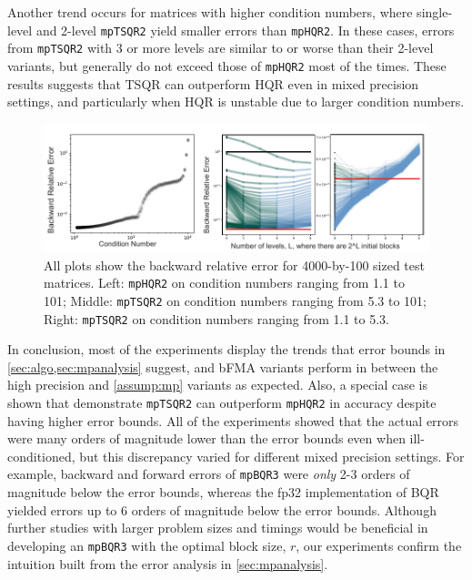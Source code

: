\documentclass[review,onefignum,onetabnum]{siamart190516}
\begin{document}
Another trend occurs for matrices with higher condition numbers, where single-level and 2-level {\tt mpTSQR2} yield smaller errors than {\tt mpHQR2}. 
In these cases, errors from {\tt mpTSQR2} with 3 or more levels are similar to or worse than their 2-level variants, but generally do not exceed those of {\tt mpHQR2} most of the times.
These results suggests that TSQR can outperform HQR even in mixed precision settings, and particularly when HQR is unstable due to larger condition numbers.
\begin{figure}[h!]%
	\centering
	\includegraphics[width=\textwidth]{./figures/allTSQR3.pdf}
	\vspace{-15pt}
	\caption{\label{fig:allTSQR} All plots show the backward relative error for 4000-by-100 sized test matrices. Left: {\tt mpHQR2} on condition numbers ranging from 1.1 to 101;  Middle: {\tt mpTSQR2} on condition numbers ranging from 5.3 to 101; Right:  {\tt mpTSQR2} on condition numbers ranging from 1.1 to 5.3. }
	\vspace{-15pt}
\end{figure}

In conclusion, most of the experiments display the trends that error bounds in \cref{sec:algo,sec:mpanalysis} suggest, and bFMA variants perform in between the high precision and \cref{assump:mp} variants as expected.
Also, a special case is shown that demonstrate {\tt mpTSQR2} can outperform {\tt mpHQR2} in accuracy despite having higher error bounds.
All of the experiments showed that the actual errors were many orders of magnitude lower than the error bounds even when ill-conditioned, but this discrepancy varied for different mixed precision settings.
For example, backward and forward errors of {\tt mpBQR3} were \emph{only} 2-3 orders of magnitude below the error bounds, whereas the fp32 implementation of BQR yielded errors up to 6 orders of magnitude below the error bounds.
Although further studies with larger problem sizes and timings would be beneficial in developing an {\tt mpBQR3} with the optimal block size, $r$, our experiments confirm the intuition built from the error analysis in \cref{sec:mpanalysis}.
\end{document}
